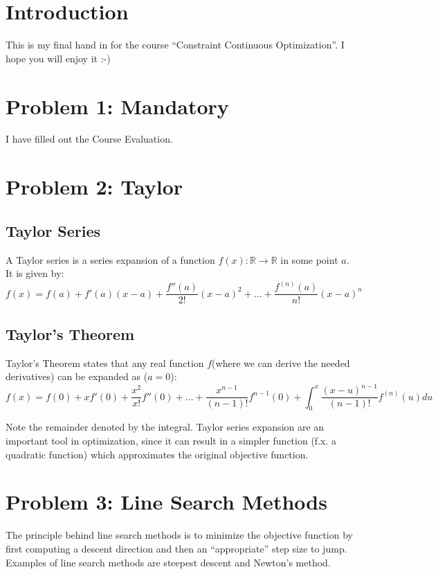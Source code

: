 \documentclass[10pt,oneside,a4paper,final,english]{memoir}
\begin{document}




\maketitle
\newpage

\frontmatter
\tableofcontents
\newpage

\section{Introduction}
This is my final hand in for the course ``Constraint Continuous
Optimization''. I hope you will enjoy it :-)

\section{Problem 1: Mandatory}
I have filled out the Course Evaluation.


\section{Problem 2: Taylor}
\subsection{Taylor Series}
A Taylor series is a series expansion of a function $f(x) : \mathbb{R}
\rightarrow \mathbb{R}$ in some point $a$. It is given by:
\[ f(x) = f(a) + f'(a)(x-a) + \frac{f''(a)}{2!}(x-a)^2 + \ldots +
\frac{f^{(n)}(a)}{n!}(x-a)^n \]

\subsection{Taylor's Theorem}
Taylor's Theorem states that any real function $f$(where we can derive
the needed derivatives) can be expanded as ($a = 0$):
\[ f(x) = f(0) + x f'(0) + \frac{x^2}{x!}f''(0) + \ldots +
\frac{x^{n-1}}{(n-1)!} f^{n-1}(0) +
\int^x_0{\frac{(x-u)^{n-1}}{(n-1)!}f^{(n)}(u) du}\]

Note the remainder denoted by the integral. Taylor series expansion
are an important tool in optimization, since it can result in a simpler
function (f.x. a quadratic function) which approximates the original
objective function.

\section{Problem 3: Line Search Methods}
The principle behind line search methods is to minimize the objective
function by first computing a descent direction and then an
``appropriate'' step size to jump. Examples of line search methods are
steepest descent and Newton's method.
\end{document}

